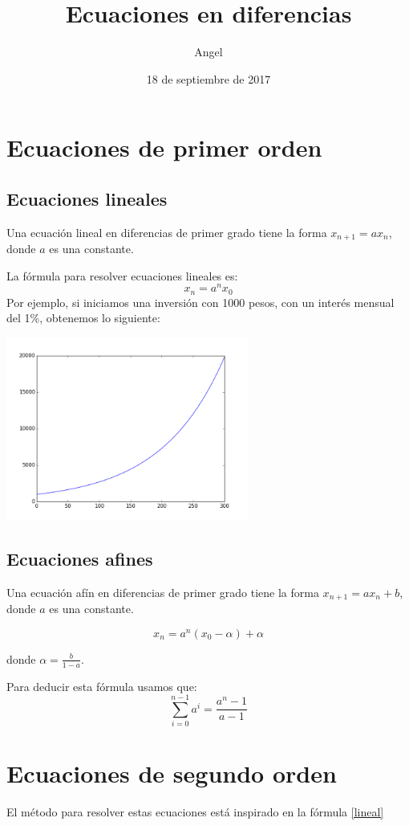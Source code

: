 \documentclass{article}
\title{Ecuaciones en diferencias}
\author{Angel}
\date{18 de septiembre de 2017}
\begin{document}
\maketitle

\section{Ecuaciones de primer orden}

\subsection{Ecuaciones lineales}

Una ecuación lineal en diferencias de primer grado tiene la forma $x_{n+1}=ax_n$, donde $a$ es una constante.

La fórmula para resolver ecuaciones lineales es:
\begin{equation}
 \label{lineal}
x_n=a^nx_0
\end{equation}
Por ejemplo, si iniciamos una inversión con 1000 pesos, con un interés mensual del 1\%, obtenemos lo siguiente:
\begin{center}
  \includegraphics[width=8cm]{inversion.png}
\end{center}



\subsection{Ecuaciones afines}

Una ecuación afín en diferencias de primer grado tiene la forma $x_{n+1}=ax_n+b$, donde $a$ es una constante.

\begin{equation}
  \label{afin}
  x_n=a^n(x_0-\alpha)+\alpha
\end{equation}

donde $\alpha=\frac{b}{1-a}$.

Para deducir esta fórmula usamos que: $$\sum_{i=0}^{n-1}a^i=\frac{a^n-1}{a-1}$$

\section{Ecuaciones de segundo orden}

El método para resolver estas ecuaciones está inspirado en la fórmula \ref{lineal}
\end{document}
